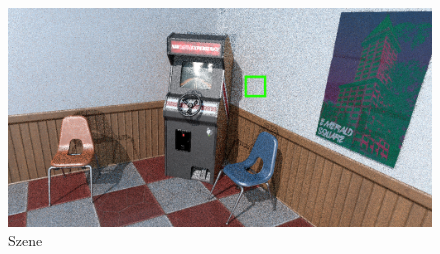 \begin{figure}[H]
    \centering \includegraphics[scale=.25]{content/TemporalerAlg/Bilder/Retargeting/Szene/Szene1.png}
    \caption{Szene}
    \label{fig:Sorting_retarget_Szene_t1}
\end{figure}
